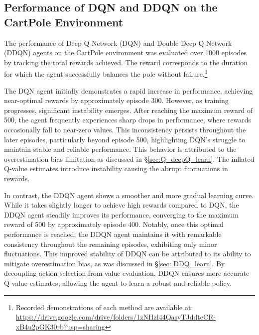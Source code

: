 \documentclass{article}
\begin{document}
\subsection{Performance of DQN and DDQN on the CartPole Environment}

The performance of Deep Q-Network (DQN) and Double Deep Q-Network (DDQN) agents on the CartPole environment was evaluated over 1000 episodes by tracking the total rewards achieved. The reward corresponds to the duration for which the agent successfully balances the pole without failure.\footnote{Recorded demonstrations of each method are available at: \url{https://drive.google.com/drive/folders/1zNHzl44QasyTJddteCR-xB4u2pGK30rb?usp=sharing}}


The DQN agent initially demonstrates a rapid increase in performance, achieving near-optimal rewards by approximately episode 300. However, as training progresses, significant instability emerges. After reaching the maximum reward of 500, the agent frequently experiences sharp drops in performance, where rewards occasionally fall to near-zero values. This inconsistency persists throughout the later episodes, particularly beyond episode 500, highlighting DQN’s struggle to maintain stable and reliable performance. This behavior is attributed to the overestimation bias limitation as discussed in \S\ref{sec:Q_deepQ_learn}. The inflated Q-value estimates introduce instability causing the abrupt fluctuations in rewards.



In contrast, the DDQN agent shows a smoother and more gradual learning curve. While it takes slightly longer to achieve high rewards compared to DQN, the DDQN agent steadily improves its performance, converging to the maximum reward of 500 by approximately episode 400. Notably, once this optimal performance is reached, the DDQN agent maintains it with remarkable consistency throughout the remaining episodes, exhibiting only minor fluctuations. This improved stability of DDQN can be attributed to its ability to mitigate overestimation bias, as was discussed in \S\ref{sec: DDQ_learn}. By decoupling action selection from value evaluation, DDQN ensures more accurate Q-value estimates, allowing the agent to learn a robust and reliable policy.
\end{document}
